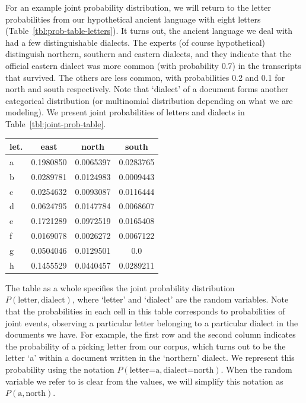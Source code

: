 For an example joint probability distribution,
we will return to the letter probabilities
from our hypothetical ancient language with eight letters
(Table~\ref{tbl:prob-table-letters}).
It turns out,
the ancient language we deal with had a few distinguishable dialects.
The experts (of course hypothetical) distinguish northern,
southern and eastern dialects,
and they indicate that the official eastern dialect was more common
(with probability \num{0.7}) in the transcripts that survived.
The others are less common,
with probabilities \num{0.2} and \num{0.1}
for north and south respectively.
Note that `dialect' of a document forms
another categorical distribution
(or multinomial distribution depending on what we are modeling).
We present joint probabilities of letters and dialects in
Table~\ref{tbl:joint-prob-table}.
\begin{margintable}
  \caption{\label{tbl:joint-prob-table}%
    Joint probability table for letters and dialects
    in our example ancient language.
  }
  \begin{center}
    \setlength{\tabcolsep}{3pt}
    \begin{tabular}{lS[round-precision=3]S[round-precision=3]S[round-precision=3]}
      \toprule
      let. & {east} & {north} & {south} \\
      \midrule
      a & 0.1980850&0.0065397&0.0283765\\
      b & 0.0289781&0.0124983&0.0009443\\
      c & 0.0254632&0.0093087&0.0116444\\
      d & 0.0624795&0.0147784&0.0068607\\
      e & 0.1721289&0.0972519&0.0165408\\
      f & 0.0169078&0.0026272&0.0067122\\
      g & 0.0504046&0.0129501&0.0      \\
      h & 0.1455529&0.0440457&0.0289211\\
      \bottomrule
    \end{tabular}
  \end{center}
\end{margintable}
The table as a whole specifies the joint probability distribution
$P(\text{letter}, \text{dialect})$,
where `letter' and `dialect' are the random variables.
Note that the probabilities in each cell in this table corresponds to
probabilities of joint events,
observing a particular letter belonging to a particular dialect
in the documents we have.
For example, the first row and the second column indicates
the probability of a picking letter from our corpus,
which turns out to be the letter `a'
within a document written in the `northern' dialect.
We represent this probability using the notation 
$P(\text{letter=a}, \text{dialect=north})$.
When the random variable we refer to is clear from the values,
we will simplify this notation as $P(\text{a},\text{north})$.


